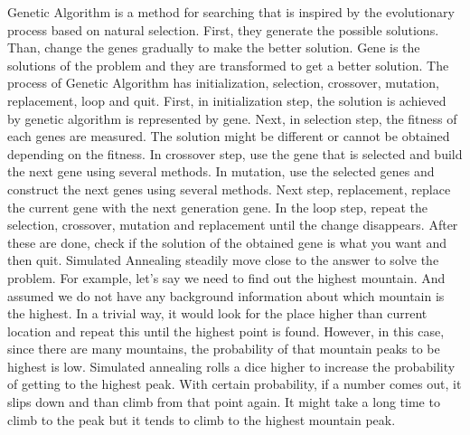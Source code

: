 \documentclass[12pt]{article}
\begin{document}
\hspace*{10mm} Genetic Algorithm is a method for searching that is inspired by the evolutionary process based on natural selection. First, they generate the possible solutions. Than, change the genes gradually to make the better solution. Gene is the solutions of the problem and they are transformed to get a better solution. The process of Genetic Algorithm has initialization, selection, crossover, mutation, replacement, loop and quit. First, in initialization step, the solution is achieved by genetic algorithm is represented by gene. Next, in selection step, the fitness of each genes are measured. The solution might be different or cannot be obtained depending on the fitness. In crossover step, use the gene that is selected and build the next gene using several methods. In mutation, use the selected genes and construct the next genes using several methods. Next step, replacement, replace the current gene with the next generation gene. In the loop step, repeat the selection, crossover, mutation and replacement until the change disappears. After these are done, check if the solution of the obtained gene is what you want and then quit.\cite{journal7}
\newline
\hspace*{10mm} Simulated Annealing steadily move close to the answer to solve the problem. For example, let's say we need to find out the highest mountain. And assumed we do not have any background information about which mountain is the highest. In a trivial way, it would look for the place higher than current location and repeat this until the highest point is found. However, in this case, since there are many mountains, the probability of that mountain peaks to be highest is low.\cite{journal2} Simulated annealing rolls a dice higher to increase the probability of getting to the highest peak. With certain probability, if a number comes out, it slips down and than climb from that point again. It might take a long time to climb to the peak but it tends to climb to the highest mountain peak.\cite{journal} \newline

\newpage


\end{document}
